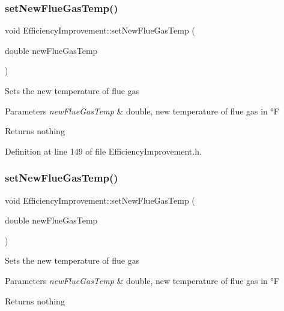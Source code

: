 \subsubsection{\texorpdfstring{set\+New\+Flue\+Gas\+Temp()}{setNewFlueGasTemp()}\hspace{0.1cm}{\footnotesize\ttfamily [2/3]}}
{\footnotesize\ttfamily void Efficiency\+Improvement\+::set\+New\+Flue\+Gas\+Temp (\begin{DoxyParamCaption}\item[{double}]{new\+Flue\+Gas\+Temp }\end{DoxyParamCaption})\hspace{0.3cm}{\ttfamily [inline]}}

Sets the new temperature of flue gas


\begin{DoxyParams}{Parameters}
{\em new\+Flue\+Gas\+Temp} & double, new temperature of flue gas in °F\\
\hline
\end{DoxyParams}
\begin{DoxyReturn}{Returns}
nothing 
\end{DoxyReturn}


Definition at line 149 of file Efficiency\+Improvement.\+h.

\mbox{\label{class_efficiency_improvement_ab88d3976fca8f55bb1fd3278bc427fc1}} 
\subsubsection{\texorpdfstring{set\+New\+Flue\+Gas\+Temp()}{setNewFlueGasTemp()}\hspace{0.1cm}{\footnotesize\ttfamily [3/3]}}
{\footnotesize\ttfamily void Efficiency\+Improvement\+::set\+New\+Flue\+Gas\+Temp (\begin{DoxyParamCaption}\item[{double}]{new\+Flue\+Gas\+Temp }\end{DoxyParamCaption})\hspace{0.3cm}{\ttfamily [inline]}}

Sets the new temperature of flue gas


\begin{DoxyParams}{Parameters}
{\em new\+Flue\+Gas\+Temp} & double, new temperature of flue gas in °F\\
\hline
\end{DoxyParams}
\begin{DoxyReturn}{Returns}
nothing 
\end{DoxyReturn}


